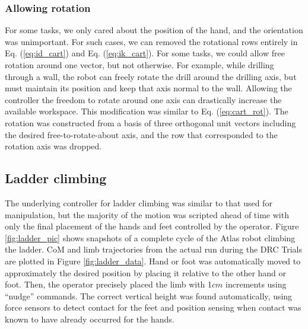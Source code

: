 \documentclass{ws-ijhr}
\newcommand{\eref}[1] {Eq. (\ref{#1})}
\newcommand{\fref}[1] {Figure \ref{#1}}
\begin{document}
\subsubsection{Allowing rotation}
For some tasks, we only cared about the position of the hand, and the 
orientation was unimportant. 
For such cases, we can removed the rotational rows entirely 
in \eref{eq:id_cart} and \eref{eq:ik_cart}. 
For some tasks, we could allow free rotation around one vector, but not 
otherwise. 
For example, while drilling through a wall, the robot can freely rotate the 
drill around the drilling axis, but must maintain its position and keep that 
axis normal to the wall. 
Allowing the controller the freedom to rotate around one axis can drastically 
increase the available workspace. 
This modification was similar to \eref{eq:cart_rot}. 
The rotation was constructed from a basis of three orthogonal unit vectors including 
the desired free-to-rotate-about axis, and the row that corresponded to the 
rotation axis was dropped. 

\subsection{Ladder climbing}
The underlying controller for ladder climbing was similar to that used for 
manipulation, but the majority of the motion was scripted ahead of time with 
only the final placement of the hands and feet controlled by the operator. 
\fref{fig:ladder_pic} shows snapshots of a complete cycle of the Atlas robot
climbing the ladder. 
CoM and limb trajectories from the actual run during the DRC Trials are 
plotted in \fref{fig:ladder_data}. 
Hand or foot was automatically moved to approximately the desired position by 
placing it relative to the other hand or foot. 
Then, the operator precisely placed the limb with 1$cm$ increments using 
``nudge'' commands. 
The correct vertical height was found automatically, using force sensors to 
detect contact for the feet and position sensing when contact was
known to have already occurred for the hands.
\end{document}
